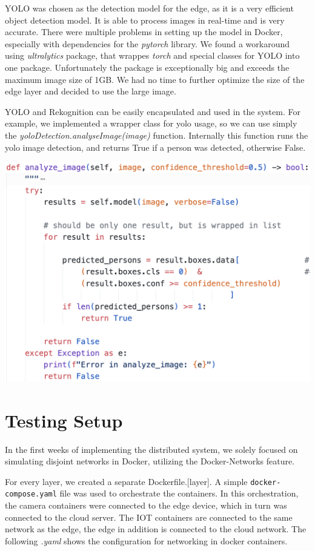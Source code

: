 \documentclass[conference]{IEEEtran}
\begin{document}
YOLO was chosen as the detection model for the edge, as it is a very efficient object detection model. It is able to process images in real-time and is very accurate. There were multiple problems in setting up the model in Docker, especially with dependencies for the \textit{pytorch} library. We found a workaround using \textit{ultralytics} package, that wrappes \textit{torch} and special classes for YOLO into one package. Unfortunately the package is exceptionally big and exceeds the maximum image size of 1GB. We had no time to further optimize the size of the edge layer and decided to use the large image. 

YOLO and Rekognition can be easily encapsulated and used in the system. 
For example, we implemented a wrapper class for yolo usage, so we can use simply the \textit{yoloDetection.analyseImage(image)} function. 
Internally this function runs the yolo image detection, and returns True if a person was detected, otherwise False. 

\begin{center}
\includegraphics[width=1\linewidth]{analyze_image-function.png}
\end{center}

\section{Testing Setup}
In the first weeks of implementing the distributed system, we solely focused on simulating disjoint networks in Docker, utilizing the Docker-Networks feature. 

For every layer, we created a separate Dockerfile.[layer]. A simple \texttt{docker-compose.yaml} file was used to orchestrate the containers. In this orchestration, the camera containers were connected to the edge device, which in turn was connected to the cloud server. 
The IOT containers are connected to the same network as the edge, the edge in addition is connected to the cloud network. 
The following \textit{.yaml} shows the configuration for networking in docker containers.
\end{document}
